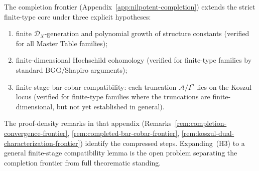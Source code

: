 \begin{remark}
\label{rem:completion-frontier-crystallization}
The completion frontier (Appendix~\ref{app:nilpotent-completion})
extends the strict finite-type core under three explicit hypotheses:
\begin{enumerate}[label=\textup{(H\arabic*)}]
\item finite $\mathcal{D}_X$-generation and polynomial growth of
  structure constants (verified for all Master Table families);
\item finite-dimensional Hochschild cohomology (verified for
  finite-type families by standard BGG/Shapiro arguments);
\item finite-stage bar-cobar compatibility: each truncation
  $\mathcal{A}/I^n$ lies on the Koszul locus (verified for
  finite-type families where the truncations are finite-dimensional,
  but not yet established in general).
\end{enumerate}
The proof-density remarks in that appendix
(Remarks~\ref{rem:completion-convergence-frontier},
\ref{rem:completed-bar-cobar-frontier},
\ref{rem:koszul-dual-characterization-frontier}) identify the
compressed steps.  Expanding~(H3) to a general finite-stage
compatibility lemma is the open problem separating the completion
frontier from full theorematic standing.
\end{remark}

